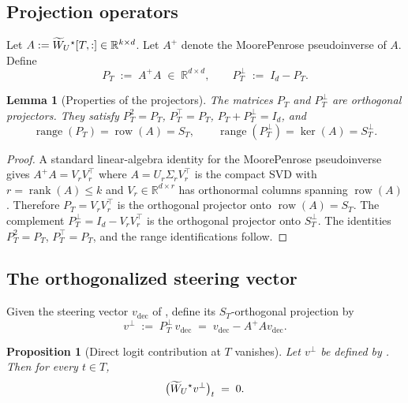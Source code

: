 \documentclass[11pt,letterpaper]{article}
\theoremstyle{plain}
\newtheorem{proposition}[theorem]{Proposition}
\newtheorem{lemma}[theorem]{Lemma}
\theoremstyle{definition}
\DeclareMathOperator{\range}{range}
\DeclareMathOperator{\rank}{rank}
\DeclareMathOperator{\rowsp}{row}
\newcommand{\R}{\mathbb{R}}
\newcommand{\1}{\mathbf{1}}
\newcommand{\WUt}{\widetilde{W}_{U}\mathchoice{}{}{}{}}
\newcommand{\vdec}{v_{\text{dec}}}
\newcommand{\vperp}{v^{\perp}}
\newcommand{\PT}{P_{T}}
\newcommand{\PTperp}{P_{T}^{\perp}}
\begin{document}
\subsection{Projection operators}

Let $A := \WUt^\star[T,:] \in \R^{k \times d}$. Let $A^+$ denote the Moore\textendash Penrose pseudoinverse of $A$. Define
\begin{equation}
\PT \;:=\; A^+ A \;\in\; \R^{d \times d}, \qquad \PTperp \;:=\; I_d - \PT.
\label{eq:projectors}
\end{equation}

\begin{lemma}[Properties of the projectors]\label{lem:projectors}
The matrices $\PT$ and $\PTperp$ are orthogonal projectors. They satisfy $\PT^2 = \PT$, $\PT^\top = \PT$, $\PT + \PTperp = I_d$, and
\begin{equation}
\range(\PT) = \rowsp(A) = S_T, \qquad \range(\PTperp) = \ker(A) = S_T^\perp.
\label{eq:projectorimage}
\end{equation}
\end{lemma}

\begin{proof}
A standard linear-algebra identity for the Moore\textendash Penrose pseudoinverse gives $A^+ A = V_r V_r^\top$ where $A = U_r \Sigma_r V_r^\top$ is the compact SVD with $r = \rank(A) \leq k$ and $V_r \in \R^{d \times r}$ has orthonormal columns spanning $\rowsp(A)$. Therefore $\PT = V_r V_r^\top$ is the orthogonal projector onto $\rowsp(A) = S_T$. The complement $\PTperp = I_d - V_r V_r^\top$ is the orthogonal projector onto $S_T^\perp$. The identities $\PT^2 = \PT$, $\PT^\top = \PT$, and the range identifications follow.
\end{proof}

\subsection{The orthogonalized steering vector}

Given the steering vector $\vdec$ of , define its $S_T$-orthogonal projection by
\begin{equation}
\vperp \;:=\; \PTperp \,\vdec \;=\; \vdec - A^+ A \vdec.
\label{eq:vperp}
\end{equation}

\begin{proposition}[Direct logit contribution at $T$ vanishes]\label{prop:zerodirect}
Let $\vperp$ be defined by . Then for every $t \in T$,
\begin{equation}
\big(\WUt^\star \vperp\big)_t \;=\; 0.
\label{eq:directzero}
\end{equation}
\end{proposition}
\end{document}
